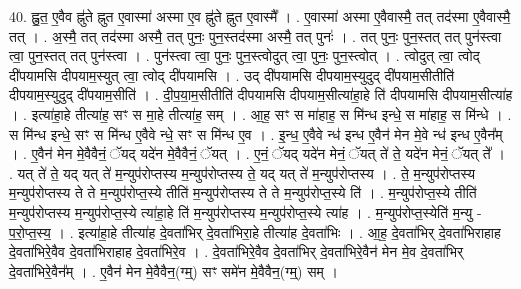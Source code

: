\documentclass[17pt]{extarticle}
\begin{document}
40. ह्नु॒त॒ ए॒वैव ह्नु॑ते ह्नुत ए॒वास्मा॑ अस्मा ए॒व ह्नु॑ते ह्नुत ए॒वास्मै᳚ । . ए॒वास्मा॑ अस्मा ए॒वैवास्मै॒ तत् तद॑स्मा ए॒वैवास्मै॒ तत् । . अ॒स्मै॒ तत् तद॑स्मा अस्मै॒ तत् पुनः॒ पुन॒स्तद॑स्मा अस्मै॒ तत् पुनः॑ । . तत् पुनः॒ पुन॒स्तत् तत् पुन॑स्त्वा त्वा॒ पुन॒स्तत् तत् पुन॑स्त्वा । . पुन॑स्त्वा त्वा॒ पुनः॒ पुन॒स्त्वोदुत् त्वा॒ पुनः॒ पुन॒स्त्वोत् । . त्वोदुत् त्वा॒ त्वोद् दी॑पयामसि दीपयाम॒स्युत् त्वा॒ त्वोद् दी॑पयामसि । . उद् दी॑पयामसि दीपयाम॒स्युदुद् दी॑पयाम॒सीतीति॑ दीपयाम॒स्युदुद् दी॑पयाम॒सीति॑ । . दी॒प॒या॒म॒सीतीति॑ दीपयामसि दीपयाम॒सीत्या॑हा॒हे ति॑ दीपयामसि दीपयाम॒सीत्या॑ह । . इत्या॑हा॒हे तीत्या॑ह॒ सꣳ स मा॒हे तीत्या॑ह॒ सम् । . आ॒ह॒ सꣳ स मा॑हाह॒ स मि॑न्ध इन्धे॒ स मा॑हाह॒ स मि॑न्धे । . स मि॑न्ध इन्धे॒ सꣳ स मि॑न्ध ए॒वैवे न्धे॒ सꣳ स मि॑न्ध ए॒व । . इ॒न्ध॒ ए॒वैवे न्ध॑ इन्ध ए॒वैन॑ मेन मे॒वे न्ध॑ इन्ध ए॒वैन᳚म् । . ए॒वैन॑ मेन मे॒वैवैनं॒ ॅयद् यदे॑न मे॒वैवैनं॒ ॅयत् । . ए॒नं॒ ॅयद् यदे॑न मेनं॒ ॅयत् ते॑ ते॒ यदे॑न मेनं॒ ॅयत् ते᳚ । . यत् ते॑ ते॒ यद् यत् ते॑ म॒न्युप॑रोप्तस्य म॒न्युप॑रोप्तस्य ते॒ यद् यत् ते॑ म॒न्युप॑रोप्तस्य । . ते॒ म॒न्युप॑रोप्तस्य म॒न्युप॑रोप्तस्य ते ते म॒न्युप॑रोप्त॒स्ये तीति॑ म॒न्युप॑रोप्तस्य ते ते म॒न्युप॑रोप्त॒स्ये ति॑ । . म॒न्युप॑रोप्त॒स्ये तीति॑ म॒न्युप॑रोप्तस्य म॒न्युप॑रोप्त॒स्ये त्या॑हा॒हे ति॑ म॒न्युप॑रोप्तस्य म॒न्युप॑रोप्त॒स्ये त्या॑ह । . म॒न्युप॑रोप्त॒स्येति॑ म॒न्यु - प॒रो॒प्त॒स्य॒ । . इत्या॑हा॒हे तीत्या॑ह दे॒वता॑भिर् दे॒वता॑भिरा॒हे तीत्या॑ह दे॒वता॑भिः । . आ॒ह॒ दे॒वता॑भिर् दे॒वता॑भिराहाह दे॒वता॑भिरे॒वैव दे॒वता॑भिराहाह दे॒वता॑भिरे॒व । . दे॒वता॑भिरे॒वैव दे॒वता॑भिर् दे॒वता॑भिरे॒वैन॑ मेन मे॒व दे॒वता॑भिर् दे॒वता॑भिरे॒वैन᳚म् । . ए॒वैन॑ मेन मे॒वैवैन॒(ग्म्॒) सꣳ समे॑न मे॒वैवैन॒(ग्म्॒) सम् । \newline
\pagebreak
{}
\end{document}
